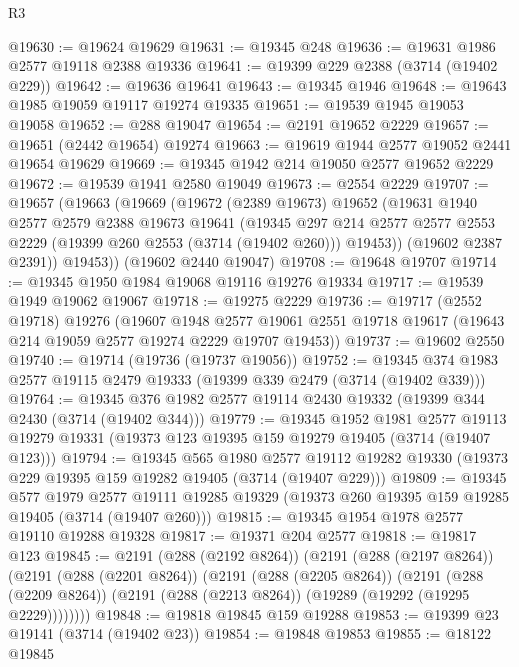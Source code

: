 \begin{lexlean}{R3}
\begin{coremodule}
@19630 := @19624 @19629
@19631 := @19345 @248
@19636 := @19631 @1986 @2577 @19118 @2388 @19336
@19641 := @19399 @229 @2388 (@3714 (@19402 @229))
@19642 := @19636 @19641
@19643 := @19345 @1946
@19648 := @19643 @1985 @19059 @19117 @19274 @19335
@19651 := @19539 @1945 @19053 @19058
@19652 := @288 @19047
@19654 := @2191 @19652 @2229
@19657 := @19651 (@2442 @19654) @19274
@19663 := @19619 @1944 @2577 @19052 @2441 @19654 @19629
@19669 := @19345 @1942 @214 @19050 @2577 @19652 @2229
@19672 := @19539 @1941 @2580 @19049
@19673 := @2554 @2229
@19707 := @19657
    (@19663
      (@19669
        (@19672
          (@2389 @19673)
          @19652
          (@19631
            @1940
            @2577
            @2579
            @2388
            @19673
            @19641
            (@19345
              @297
              @214
              @2577
              @2577
              @2553
              @2229
              (@19399 @260 @2553 (@3714 (@19402 @260)))
              @19453))
          (@19602 @2387 @2391))
        @19453))
    (@19602 @2440 @19047)
@19708 := @19648 @19707
@19714 := @19345 @1950 @1984 @19068 @19116 @19276 @19334
@19717 := @19539 @1949 @19062 @19067
@19718 := @19275 @2229
@19736 := @19717
    (@2552 @19718)
    @19276
    (@19607
      @1948
      @2577
      @19061
      @2551
      @19718
      @19617
      (@19643 @214 @19059 @2577 @19274 @2229 @19707 @19453))
@19737 := @19602 @2550
@19740 := @19714 (@19736 (@19737 @19056))
@19752 := @19345 @374 @1983 @2577 @19115 @2479 @19333 (@19399 @339 @2479 (@3714 (@19402 @339)))
@19764 := @19345 @376 @1982 @2577 @19114 @2430 @19332 (@19399 @344 @2430 (@3714 (@19402 @344)))
@19779 := @19345
    @1952
    @1981
    @2577
    @19113
    @19279
    @19331
    (@19373 @123 @19395 @159 @19279 @19405 (@3714 (@19407 @123)))
@19794 := @19345
    @565
    @1980
    @2577
    @19112
    @19282
    @19330
    (@19373 @229 @19395 @159 @19282 @19405 (@3714 (@19407 @229)))
@19809 := @19345
    @577
    @1979
    @2577
    @19111
    @19285
    @19329
    (@19373 @260 @19395 @159 @19285 @19405 (@3714 (@19407 @260)))
@19815 := @19345 @1954 @1978 @2577 @19110 @19288 @19328
@19817 := @19371 @204 @2577
@19818 := @19817 @123
@19845 := @2191
    (@288 (@2192 @8264))
    (@2191
      (@288 (@2197 @8264))
      (@2191
        (@288 (@2201 @8264))
        (@2191
          (@288 (@2205 @8264))
          (@2191
            (@288 (@2209 @8264))
            (@2191 (@288 (@2213 @8264)) (@19289 (@19292 (@19295 @2229))))))))
@19848 := @19818 @19845 @159 @19288
@19853 := @19399 @23 @19141 (@3714 (@19402 @23))
@19854 := @19848 @19853
@19855 := @18122 @19845

\end{coremodule}
\end{lexlean}
